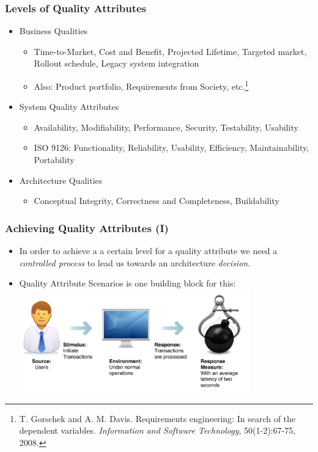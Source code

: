 \documentclass[10pt]{beamer}
\begin{document}
\begin{frame}[t]
\frametitle{Levels of Quality Attributes}
\begin{itemize}
\item Business Qualities
\begin{itemize}
\item Time-to-Market, Cost and Benefit, Projected Lifetime, Targeted market, Rollout schedule, Legacy system integration
\item Also: Product portfolio, Requirements from Society, etc.\footnote{T. Gorschek and A. M. Davis. Requirements engineering: In search of the dependent variables. \emph{Information and Software Technology}, 50(1-2):67-75, 2008.}
\end{itemize}
\item System Quality Attributes
\begin{itemize}
\item Availability, Modifiability, Performance, Security, Testability, Usability
\item ISO 9126: Functionality, Reliability, Usability, Efficiency, Maintainability, Portability
\end{itemize}
\item Architecture Qualities
\begin{itemize}
\item Conceptual Integrity, Correctness and Completeness, Buildability
\end{itemize}
\end{itemize}
\end{frame}

\begin{frame}[t]
\frametitle{Achieving Quality Attributes (I)}
\begin{itemize}
\item In order to achieve a a certain level for a quality attribute we need a \emph{controlled process} to lead us towards an architecture \emph{decision}.
\item Quality Attribute Scenarios is one building block for this:
\includegraphics[width=10cm]{IQAScenario.pdf}
\end{itemize}
\end{frame}
\end{document}
